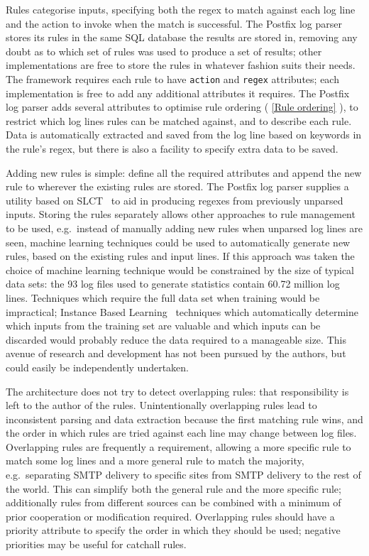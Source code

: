 \documentclass[draft]{svmult}
\newcommand{\sectionref}[1]{%
    \textsection{}\vref*{#1}%
}
\newcommand{\numberOFlogFILES}[0]{%
    93%
}
\newcommand{\numberOFlogLINEShuman}[0]{%
    60.72 million%
}
\begin{document}
\label{Rules}

Rules categorise inputs, specifying both the regex to match against each
log line and the action to invoke when the match is successful.  The
Postfix log parser stores its rules in the same SQL database the results
are stored in, removing any doubt as to which set of rules was used to
produce a set of results; other implementations are free to store the rules
in whatever fashion suits their needs.  The framework requires each rule to
have \texttt{action} and \texttt{regex} attributes; each implementation is
free to add any additional attributes it requires.  The Postfix log parser
adds several attributes to optimise rule ordering (\sectionref{Rule
ordering}), to restrict which log lines rules can be matched against, and
to describe each rule.  Data is automatically extracted and saved from the
log line based on keywords in the rule's regex, but there is also a
facility to specify extra data to be saved.

Adding new rules is simple: define all the required attributes and append
the new rule to wherever the existing rules are stored.  The Postfix log
parser supplies a utility based on SLCT~\cite{slct-paper} to aid in
producing regexes from previously unparsed inputs.  Storing the rules
separately allows other approaches to rule management to be used, e.g.\
instead of manually adding new rules when unparsed log lines are seen,
machine learning techniques could be used to automatically generate new
rules, based on the existing rules and input lines.  If this approach was
taken the choice of machine learning technique would be constrained by the
size of typical data sets: the \numberOFlogFILES{} log files used to
generate statistics contain \numberOFlogLINEShuman{} log lines.  Techniques
which require the full data set when training would be impractical;
Instance Based Learning~\cite{instance-based-learning} techniques which
automatically determine which inputs from the training set are valuable and
which inputs can be discarded would probably reduce the data required to a
manageable size.  This avenue of research and development has not been
pursued by the authors, but could easily be independently undertaken.

\label{overlapping rules}

The architecture does not try to detect overlapping rules: that
responsibility is left to the author of the rules.  Unintentionally
overlapping rules lead to inconsistent parsing and data extraction because
the first matching rule wins, and the order in which rules are tried
against each line may change between log files.  Overlapping rules are
frequently a requirement, allowing a more specific rule to match some log
lines and a more general rule to match the majority, e.g.\ separating SMTP
delivery to specific sites from SMTP delivery to the rest of the world.
This can simplify both the general rule and the more specific rule;
additionally rules from different sources can be combined with a minimum of
prior cooperation or modification required.  Overlapping rules should have
a priority attribute to specify the order in which they should be used;
negative priorities may be useful for catchall rules.
\end{document}

